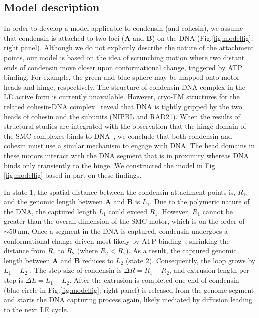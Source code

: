 \documentclass[fleqn,10pt]{wlscirep}
\newcommand{\nm}{\ \mathrm{nm}}
\newcommand{\DR}{\Delta {R}}
\newcommand{\Dl}{\Delta {L}}
\begin{document}
\subsection*{Model description}
In order to develop a model applicable to condensin (and cohesin), we assume that condensin is attached to  two loci ({\bf A} and {\bf B}) on the DNA (Fig.\ref{fig:modelfig}; right panel). Although we do not explicitly describe the nature of the attachment points, our model is based on the idea of scrunching motion where two distant ends of condensin move closer upon conformational change, triggered by ATP binding. For example, the green and blue sphere may be mapped onto motor heads and hinge, respectively.   
The structure of condensin-DNA complex in the LE active form is currently unavailable. However,  cryo-EM structures for the related cohesin-DNA complex~\cite{shi2020cryo} reveal that DNA is tightly gripped by the two heads of cohesin and the subunits (NIPBL and RAD21). When the results of structural studies are integrated with the observation that the hinge domain of the SMC complexes binds to DNA~\cite{chiu2004dna,griese2010structure,alt2017specialized}, we conclude that both condensin and cohesin must use a similar mechanism to engage with  DNA. The head domains in these motors interact with the DNA segment that is in proximity whereas DNA binds only  transiently to the hinge. We constructed the model in Fig.\ref{fig:modelfig} based in part on these findings.

In state 1, the spatial distance between the condensin attachment points is, $R_1$, and  the genomic length between {\bf A} and {\bf B} is $L_1$. Due to the polymeric nature of the DNA, the captured length $L_1$ could exceed $R_1$. However, $R_1$ cannot be greater than the overall dimension of the SMC motor, which is on the order of $\sim 50\nm$. Once a segment in the DNA is captured, condensin undergoes a conformational change driven most likely by ATP binding~\cite{ryu2020resolving}, shrinking the distance from $R_1$ to $R_2$ (where $R_2 < R_1$). As a result, the captured genomic length between {\bf A} and {\bf B}  reduces  to $L_2$ (state 2). Consequently, the loop grows by $L_1-L_2$ . The step size of condensin is $\DR=R_1-R_2$, and extrusion length per step is $\Dl=L_1-L_2$. After the extrusion is completed one end of condensin (blue circle in Fig.\ref{fig:modelfig}; right panel) is released from the genome segment and starts the DNA capturing process again, likely mediated by diffusion leading to the next LE cycle. 
\end{document}
